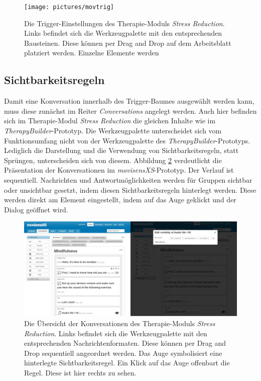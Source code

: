 \begin{figure}[h]
\centering
\texttt{[image: pictures/movtrig]}
\caption{Die Trigger-Einstellungen des Therapie-Moduls \emph{Stress Reduction}. Links befindet sich die Werkzeugpalette mit den entsprechenden Bausteinen. Diese können per Drag and Drop auf dem Arbeitsblatt platziert werden. Einzelne Elemente werden}
\label{start}
\end{figure}



\subsection{Sichtbarkeitsregeln}
Damit eine Konversation innerhalb des Trigger-Baumes ausgewählt werden kann, muss diese zunächst im Reiter \emph{Conversations} angelegt werden. Auch hier befinden sich im Therapie-Modul \emph{Stress Reduction} die gleichen Inhalte wie im \emph{TherapyBuilder}-Prototyp. Die Werkzeugpalette unterscheidet sich vom Funktionsumfang nicht von der Werkzeugpalette des \emph{TherapyBuilder}-Prototyps. Lediglich die Darstellung und die Verwendung von Sichtbarkeitsregeln, statt Sprüngen, unterscheiden sich von diesem. Abbildung \ref{movconv} verdeutlicht die Präsentation der Konversationen im \emph{movisensXS}-Prototyp. Der Verlauf ist sequentiell. Nachrichten und Antwortmöglichkeiten werden für Gruppen sichtbar oder unsichtbar gesetzt, indem diesen Sichtbarkeitsregeln hinterlegt werden. Diese werden direkt am Element eingestellt, indem auf das Auge geklickt und der Dialog geöffnet wird.

\begin{figure}[h]
\centering
\includegraphics[width=1\textwidth]{pictures/movconv}
\caption{Die Übersicht der Konversationen des Therapie-Moduls \emph{Stress Reduction}. Links befindet sich die Werkzeugpalette mit den entsprechenden Nachrichtenformaten. Diese können per Drag and Drop sequentiell angeordnet werden. Das Auge symbolisiert eine hinterlegte Sichtbarkeitsregel. Ein Klick auf das Auge offenbart die Regel. Diese ist hier rechts zu sehen.}
\label{movconv}
\end{figure}
